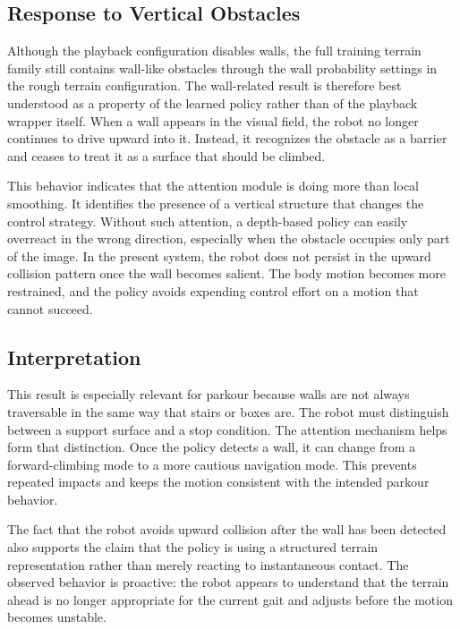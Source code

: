 \subsection{Response to Vertical Obstacles}
\label{sec:wall_response}

Although the playback configuration disables walls, the full training terrain family still contains wall-like obstacles through the wall probability settings in the rough terrain configuration. The wall-related result is therefore best understood as a property of the learned policy rather than of the playback wrapper itself. When a wall appears in the visual field, the robot no longer continues to drive upward into it. Instead, it recognizes the obstacle as a barrier and ceases to treat it as a surface that should be climbed.

This behavior indicates that the attention module is doing more than local smoothing. It identifies the presence of a vertical structure that changes the control strategy. Without such attention, a depth-based policy can easily overreact in the wrong direction, especially when the obstacle occupies only part of the image. In the present system, the robot does not persist in the upward collision pattern once the wall becomes salient. The body motion becomes more restrained, and the policy avoids expending control effort on a motion that cannot succeed.

\subsection{Interpretation}
\label{sec:wall_interpretation}

This result is especially relevant for parkour because walls are not always traversable in the same way that stairs or boxes are. The robot must distinguish between a support surface and a stop condition. The attention mechanism helps form that distinction. Once the policy detects a wall, it can change from a forward-climbing mode to a more cautious navigation mode. This prevents repeated impacts and keeps the motion consistent with the intended parkour behavior.

The fact that the robot avoids upward collision after the wall has been detected also supports the claim that the policy is using a structured terrain representation rather than merely reacting to instantaneous contact. The observed behavior is proactive: the robot appears to understand that the terrain ahead is no longer appropriate for the current gait and adjusts before the motion becomes unstable.

